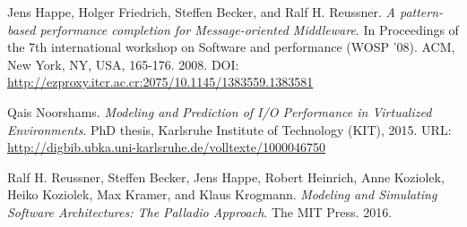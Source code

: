 \documentclass[11pt, twoside]{report}
\begin{document}
\begin{thebibliography}{9}
 Jens Happe, Holger Friedrich, Steffen Becker, and Ralf H. Reussner. \emph{A pattern-based performance completion for Message-oriented Middleware}. In Proceedings of the 7th international workshop on Software and performance (WOSP '08). ACM, New York, NY, USA, 165-176. 2008. DOI: \url{http://ezproxy.itcr.ac.cr:2075/10.1145/1383559.1383581}

 Qais Noorshams. \emph{Modeling and Prediction of I/O Performance in Virtualized Environments}. PhD thesis, Karlsruhe Institute of Technology (KIT), 2015. URL: \url{http://digbib.ubka.uni-karlsruhe.de/volltexte/1000046750}

 Ralf H. Reussner, Steffen Becker, Jens Happe, Robert Heinrich, Anne Koziolek, Heiko Koziolek, Max Kramer, and Klaus Krogmann. \emph{Modeling and Simulating Software Architectures: The Palladio Approach}. The MIT Press. 2016.

\end{thebibliography}
\end{document}
